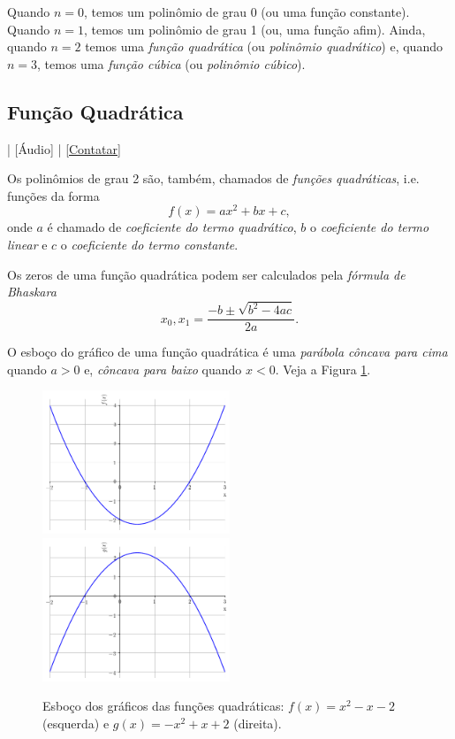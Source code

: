 Quando $n=0$, temos um polinômio de grau 0 (ou uma função constante). Quando $n=1$, temos um polinômio de grau 1 (ou, uma função afim). Ainda, quando $n=2$ temos uma \emph{função quadrática} (ou \emph{polinômio quadrático}) e, quando $n=3$, temos uma \emph{função cúbica} (ou \emph{polinômio cúbico}).

\subsection{Função Quadrática}

\begin{flushright}
  [Vídeo] | [Áudio] | \href{https://phkonzen.github.io/notas/contato.html}{[Contatar]}
\end{flushright}

Os polinômios de grau 2 são, também, chamados de \emph{funções quadráticas}, i.e. funções da forma
\begin{equation}
  f(x) = ax^2 + bx + c,
\end{equation}
onde $a$ é chamado de \emph{coeficiente do termo quadrático}, $b$ o \emph{coeficiente do termo linear} e $c$ o \emph{coeficiente do termo constante}.

Os zeros de uma função quadrática podem ser calculados pela \emph{fórmula de Bhaskara}
\begin{equation}\label{eq:Bhaskara}
  x_0, x_1 = \frac{-b \pm \sqrt{b^2 - 4ac}}{2a}.
\end{equation}

O esboço do gráfico de uma função quadrática é uma \emph{parábola côncava para cima} quando $a > 0$ e, \emph{côncava para baixo} quando $x < 0$. Veja a Figura \ref{fig:funquad_concavidade}.

\begin{figure}[H]
  \centering
  \includegraphics[width=0.5\textwidth]{./cap_funcao/dados/fig_funquad_concavidade/fig_funquad_concavidade_cima}~
    \includegraphics[width=0.5\textwidth]{./cap_funcao/dados/fig_funquad_concavidade/fig_funquad_concavidade_baixo}
  \caption{Esboço dos gráficos das funções quadráticas: $f(x) = x^2-x-2$ (esquerda) e $g(x)=-x^2+x+2$ (direita).}
  \label{fig:funquad_concavidade}
\end{figure}


